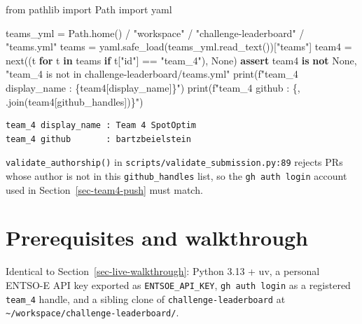 \documentclass[
  english,
  letterpaper,
]{scrbook}
\newenvironment{Shaded}{\begin{snugshade}}{\end{snugshade}}
\newcommand{\BuiltInTok}[1]{\textcolor[rgb]{0.00,0.23,0.31}{#1}}
\newcommand{\ControlFlowTok}[1]{\textcolor[rgb]{0.00,0.23,0.31}{\textbf{#1}}}
\newcommand{\ImportTok}[1]{\textcolor[rgb]{0.00,0.46,0.62}{#1}}
\newcommand{\KeywordTok}[1]{\textcolor[rgb]{0.00,0.23,0.31}{\textbf{#1}}}
\newcommand{\NormalTok}[1]{\textcolor[rgb]{0.00,0.23,0.31}{#1}}
\newcommand{\OperatorTok}[1]{\textcolor[rgb]{0.37,0.37,0.37}{#1}}
\newcommand{\SpecialCharTok}[1]{\textcolor[rgb]{0.37,0.37,0.37}{#1}}
\newcommand{\SpecialStringTok}[1]{\textcolor[rgb]{0.13,0.47,0.30}{#1}}
\newcommand{\StringTok}[1]{\textcolor[rgb]{0.13,0.47,0.30}{#1}}
\newcommand{\VariableTok}[1]{\textcolor[rgb]{0.07,0.07,0.07}{#1}}
\begin{document}
\protect{}\label{team4-registry}
\begin{Shaded}
\begin{Highlighting}[]
\ImportTok{from}\NormalTok{ pathlib }\ImportTok{import}\NormalTok{ Path}
\ImportTok{import}\NormalTok{ yaml}

\NormalTok{teams\_yml }\OperatorTok{=}\NormalTok{ Path.home() }\OperatorTok{/} \StringTok{"workspace"} \OperatorTok{/} \StringTok{"challenge{-}leaderboard"} \OperatorTok{/} \StringTok{"teams.yml"}
\NormalTok{teams }\OperatorTok{=}\NormalTok{ yaml.safe\_load(teams\_yml.read\_text())[}\StringTok{"teams"}\NormalTok{]}
\NormalTok{team4 }\OperatorTok{=} \BuiltInTok{next}\NormalTok{((t }\ControlFlowTok{for}\NormalTok{ t }\KeywordTok{in}\NormalTok{ teams }\ControlFlowTok{if}\NormalTok{ t[}\StringTok{"id"}\NormalTok{] }\OperatorTok{==} \StringTok{"team\_4"}\NormalTok{), }\VariableTok{None}\NormalTok{)}
\ControlFlowTok{assert}\NormalTok{ team4 }\KeywordTok{is} \KeywordTok{not} \VariableTok{None}\NormalTok{, }\StringTok{"team\_4 is not in challenge{-}leaderboard/teams.yml"}
\BuiltInTok{print}\NormalTok{(}\SpecialStringTok{f"team\_4 display\_name : }\SpecialCharTok{\{}\NormalTok{team4[}\StringTok{\textquotesingle{}display\_name\textquotesingle{}}\NormalTok{]}\SpecialCharTok{\}}\SpecialStringTok{"}\NormalTok{)}
\BuiltInTok{print}\NormalTok{(}\SpecialStringTok{f"team\_4 github       : }\SpecialCharTok{\{}\StringTok{\textquotesingle{}, \textquotesingle{}}\SpecialCharTok{.}\NormalTok{join(team4[}\StringTok{\textquotesingle{}github\_handles\textquotesingle{}}\NormalTok{])}\SpecialCharTok{\}}\SpecialStringTok{"}\NormalTok{)}
\end{Highlighting}
\end{Shaded}

\begin{verbatim}
team_4 display_name : Team 4 SpotOptim
team_4 github       : bartzbeielstein
\end{verbatim}

\texttt{validate\_authorship()} in
\texttt{scripts/validate\_submission.py:89} rejects PRs whose author is
not in this \texttt{github\_handles} list, so the
\texttt{gh\ auth\ login} account used in Section~\ref{sec-team4-push}
must match.

\section{Prerequisites and
walkthrough}\label{prerequisites-and-walkthrough}

Identical to Section~\ref{sec-live-walkthrough}: Python 3.13 + uv, a
personal ENTSO-E API key exported as \texttt{ENTSOE\_API\_KEY},
\texttt{gh\ auth\ login} as a registered \texttt{team\_4} handle, and a
sibling clone of \texttt{challenge-leaderboard} at
\texttt{\textasciitilde{}/workspace/challenge-leaderboard/}.
\end{document}
